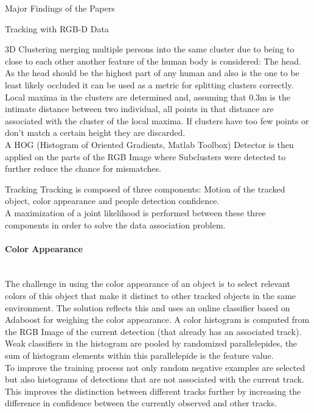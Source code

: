 \documentclass[a4paper,oneside,10pt,DIV12,headsepline,footexclude,headexclude]{scrartcl}
\begin{document}
\begin{section}{Major Findings of the Papers}
\begin{subsection}{Tracking with RGB-D Data}
\begin{subsubsection}{3D Clustering}
merging multiple persons into the same cluster due to being to close to each other
another feature of the human body is considered: The head. As the head should be
the highest part of any human and also is the one to be least likely occluded it
can be used as a metric for splitting clusters correctly. Local maxima in the
clusters are determined and, assuming that 0.3m is the intimate distance between
two individual, all points in that distance are associated with the cluster of 
the local maxima. If clusters have too few points or don't match a certain height
they are discarded.\\
A HOG (Histogram of Oriented Gradients, Matlab Toolbox) Detector is then applied on the parts
of the RGB Image where Subclusters were detected to further reduce the chance
for mismatches.
\end{subsubsection}
\begin{subsubsection}{Tracking}
Tracking is composed of three components: Motion of the tracked object, color
appearance and people detection confidence.\\
A maximization of a joint likelihood is performed between these three components 
in order to solve the data association problem.
\paragraph{Color Appearance}\mbox{}\\
The challenge in using the color appearance of an object is to select relevant
colors of this object that make it distinct to other tracked objects in the same
environment. The solution reflects this and uses an online classifier based on Adaboost 
for weighing the color appearance. A color histogram is computed from the RGB Image
of the current detection (that already has an associated track). \\
Weak classifiers in the histogram are pooled by randomized parallelepides, the 
sum of histogram elements within this parallelepide is the feature value.\\
To improve the training process not only random negative examples are selected
but also histograms of detections that are not associated with the current track.
This improves the distinction between different tracks further by increasing
the difference in confidence between the currently observed and other tracks.

\end{subsubsection}
\end{subsection}
\end{section}
\end{document}
